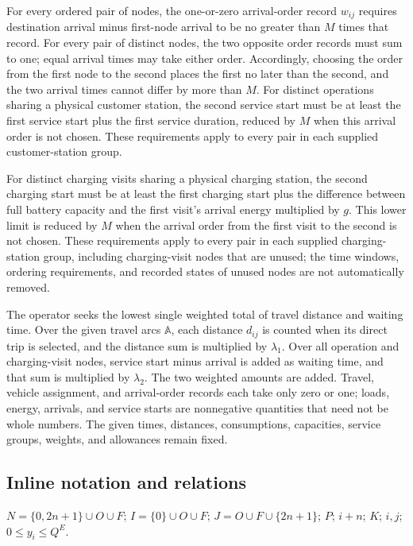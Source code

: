 \documentclass[10pt]{article}
\begin{document}
For every ordered pair of nodes, the one-or-zero arrival-order record $w_{ij}$ requires destination arrival minus first-node arrival to be no greater than $M$ times that record. For every pair of distinct nodes, the two opposite order records must sum to one; equal arrival times may take either order. Accordingly, choosing the order from the first node to the second places the first no later than the second, and the two arrival times cannot differ by more than $M$. For distinct operations sharing a physical customer station, the second service start must be at least the first service start plus the first service duration, reduced by $M$ when this arrival order is not chosen. These requirements apply to every pair in each supplied customer-station group.

For distinct charging visits sharing a physical charging station, the second charging start must be at least the first charging start plus the difference between full battery capacity and the first visit's arrival energy multiplied by $g$. This lower limit is reduced by $M$ when the arrival order from the first visit to the second is not chosen. These requirements apply to every pair in each supplied charging-station group, including charging-visit nodes that are unused; the time windows, ordering requirements, and recorded states of unused nodes are not automatically removed.

The operator seeks the lowest single weighted total of travel distance and waiting time. Over the given travel arcs $\mathbb A$, each distance $d_{ij}$ is counted when its direct trip is selected, and the distance sum is multiplied by $\lambda_1$. Over all operation and charging-visit nodes, service start minus arrival is added as waiting time, and that sum is multiplied by $\lambda_2$. The two weighted amounts are added. Travel, vehicle assignment, and arrival-order records each take only zero or one; loads, energy, arrivals, and service starts are nonnegative quantities that need not be whole numbers. The given times, distances, consumptions, capacities, service groups, weights, and allowances remain fixed.

\subsection*{Inline notation and relations}
$N=\{0,2n+1\}\cup O\cup F$; $I=\{0\}\cup O\cup F$; $J=O\cup F\cup\{2n+1\}$; $P$; $i+n$; $K$; $i,j$; $0\le y_i\le Q^E$.
\end{document}
